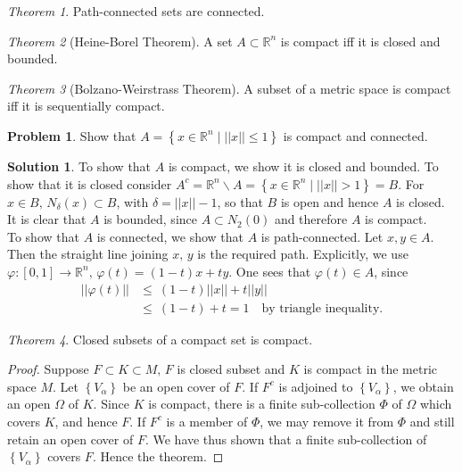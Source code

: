 \documentclass[12pt,oneside,a4paper]{book}
\newcommand{\R}{\mathds{R}}
\newcommand{\norm}[1]{\left\vert\left\vert#1\right\vert\right\vert}
\newcommand{\set}[1]{\left\{#1\right\}}
\theoremstyle{remark}
\newtheorem{thm}{Theorem}[section]
\theoremstyle{definition}
\newtheorem{prob}{Problem}[section]
\newtheorem*{soln}{Solution}
\begin{document}
\begin{thm}
    Path-connected sets are connected.
\end{thm}
\begin{thm}[Heine-Borel Theorem]
    A set $ A\subset \R^n $ is compact iff it is closed and bounded.
\end{thm}
\begin{thm}[Bolzano-Weirstrass Theorem]
    A subset of a metric space is compact iff it is sequentially compact.
\end{thm}
\begin{prob}
    Show that $ A=\set{x\in \R^n\mid \norm{x}\leq 1} $ is compact and connected.
\end{prob}
\begin{soln}
    To show that $ A $ is compact, we show it is closed and bounded. To show that it is closed consider $ A^c=\R^n\backslash A=\set{x\in \R^n\mid \norm{x}> 1}=B $. For $ x\in B,\, N_\delta(x)\subset B $, with $ \delta=\norm{x}-1 $, so that $ B $ is open and hence $ A $ is closed. It is clear that $ A $ is bounded, since $ A\subset N_2 (0) $ and therefore $ A $ is compact.\\

    To show that $ A $ is connected, we show that $ A $ is path-connected. Let $ x,y\in A $. Then the straight line joining $ x,\,y $ is the required path. Explicitly, we use $ \varphi:[0,1]\to \R^n,\,\varphi(t)=(1-t)x+ty $. One sees that $ \varphi(t)\in A $, since \begin{align*}
        \norm{\varphi(t)} &\leq\ (1-t)\norm{x}+t\norm{y}\\
        &\leq\ (1-t)+t=1\quad\text{by triangle inequality}.
    \end{align*}
\end{soln}
\begin{thm}
    Closed subsets of a compact set is compact.
\end{thm}
\begin{proof}
    Suppose $ F\subset K\subset M,\, F $ is closed subset and $ K $ is compact in the metric space $ M $. Let $ \set{V_\alpha} $ be an open cover of $ F $. If $ F^c $ is adjoined to $ \set{V_\alpha} $, we obtain an open $ \Omega $ of $ K $. Since $ K $ is compact, there is a finite sub-collection $ \Phi $ of $ \Omega $ which covers $ K $, and hence $ F $. If $ F^c $ is a member of $ \Phi $, we may remove it from $ \Phi $ and still retain an open cover of $ F $. We have thus shown that a finite sub-collection of $ \set{V_\alpha} $ covers $ F $. Hence the theorem.
\end{proof}
\end{document}
